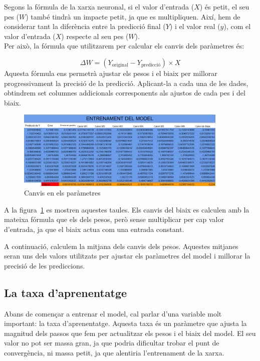 Segons la fórmula de la xarxa neuronal, si el valor d’entrada ($X$) és petit, el seu pes ($W$) també tindrà un impacte petit, ja que es multipliquen. Així, hem de considerar tant la diferència entre la predicció final ($Y$) i el valor real ($y$), com el valor d’entrada ($X$) respecte al seu pes ($W$).\\

Per això, la fórmula que utilitzarem per calcular els canvis dels paràmetres és:

$$\Delta W = (Y_{\text{original}} - Y_{\text{predicció}}) \times X$$
Aquesta fórmula ens permetrà ajustar els pesos i el biaix per millorar progressivament la precisió de la predicció. Aplicant-la a cada una de les dades, obtindrem set columnes addicionals corresponents als ajustos de cada pes i del biaix.

\begin{figure}[h!]
    \centering
    \includegraphics[width=0.9\textwidth]{./figures/Canvis.png}
    \caption{Canvis en els paràmetres}
    \label{f:canvisParametres}
\end{figure}

A la figura~\ref{f:canvisParametres} es mostren aquestes taules. Els canvis del biaix es calculen amb la mateixa fórmula que els dels pesos, però sense multiplicar per cap valor d’entrada, ja que el biaix actua com una entrada constant.

A continuació, calculem la mitjana dels canvis dels pesos. Aquestes mitjanes seran uns dels valors utilitzats per ajustar els paràmetres del model i millorar la precisió de les prediccions.
\vspace{-1.5truecm}
\subsection{La taxa d'aprenentatge}
Abans de començar a entrenar el model, cal parlar d’una variable molt important: la taxa d’aprenentatge. Aquesta taxa és un paràmetre que ajusta la magnitud dels passos que fem per actualitzar els pesos i el biaix del model. El seu valor no pot ser massa gran, ja que podria dificultar trobar el punt de convergència, ni massa petit, ja que alentiria l’entrenament de la xarxa.\\

